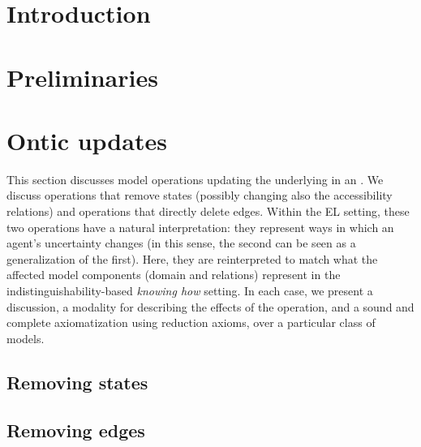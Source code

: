 \documentclass[sn-mathphys-num]{sn-jnl}%
\begin{document}
\section{Introduction}
\label{sec:intro}


\section{Preliminaries}
\label{sec:basic}






\section{Ontic updates}
\label{sec:ontic}

This section discusses model operations updating the underlying \lts in an \ults. We discuss operations that remove states (possibly changing also the accessibility relations) and operations that directly delete edges. Within the EL setting, these two operations have a natural interpretation: they represent ways in which an agent's uncertainty changes (in this sense, the second can be seen as a generalization of the first). Here, they are reinterpreted to match what the affected model components (domain and relations) represent in the indistinguishability-based \emph{knowing how} setting. In each case, we present a discussion, a modality for describing the effects of the operation, and a sound and complete axiomatization using reduction axioms, over a particular class of models.

\subsection{Removing states}
\label{sec:pal}


\subsection{Removing edges}
\label{sec:aul}

\end{document}

